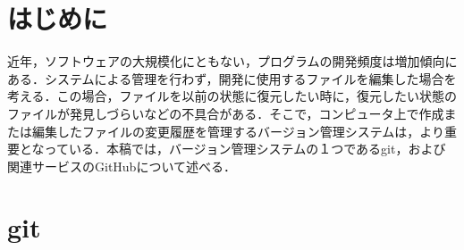 \documentclass[a4j,9pt,twocolumn]{jsarticle}
\begin{document}


\section{はじめに}
近年，ソフトウェアの大規模化にともない，プログラムの開発頻度は増加傾向にある．システムによる管理を行わず，開発に使用するファイルを編集した場合を考える．この場合，ファイルを以前の状態に復元したい時に，復元したい状態のファイルが発見しづらいなどの不具合がある．そこで，コンピュータ上で作成または編集したファイルの変更履歴を管理するバージョン管理システムは，より重要となっている．本稿では，バージョン管理システムの１つであるgit，および関連サービスのGitHubについて述べる．

\section{git}
\end{document}
